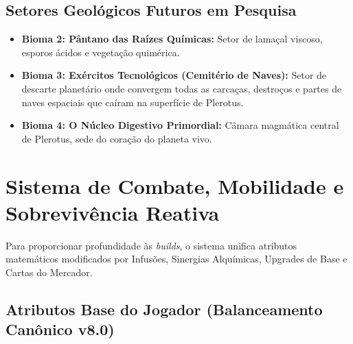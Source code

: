 \documentclass[a4paper,12pt]{report}
\begin{document}
\section{Setores Geológicos Futuros em Pesquisa}
\begin{itemize}
    \item \textbf{Bioma 2: Pântano das Raízes Químicas:} Setor de lamaçal viscoso, esporos ácidos e vegetação quimérica.
    \item \textbf{Bioma 3: Exércitos Tecnológicos (Cemitério de Naves):} Setor de descarte planetário onde convergem todas as carcaças, destroços e partes de naves espaciais que caíram na superfície de Plerotus.
    \item \textbf{Bioma 4: O Núcleo Digestivo Primordial:} Câmara magmática central de Plerotus, sede do coração do planeta vivo.
\end{itemize}

\chapter{Sistema de Combate, Mobilidade e Sobrevivência Reativa}

Para proporcionar profundidade às \textit{builds}, o sistema unifica atributos matemáticos modificados por Infusões, Sinergias Alquímicas, Upgrades de Base e Cartas do Mercador.

\section{Atributos Base do Jogador (Balanceamento Canônico v8.0)}
\end{document}
